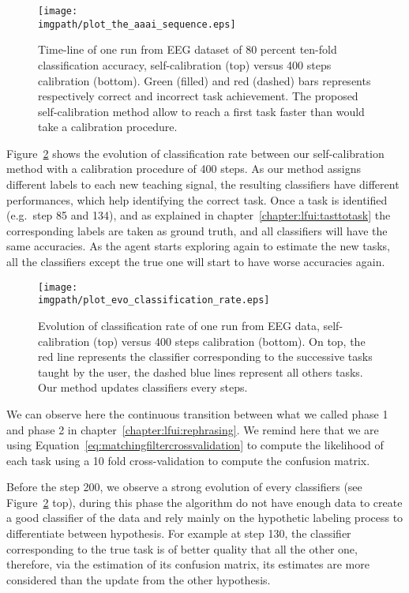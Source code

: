 \begin{figure}[!htbp]
\centering
\texttt{[image: \\imgpath/plot\_the\_aaai\_sequence.eps]}
\caption{Time-line of one run from EEG dataset of $80$ percent ten-fold classification accuracy, self-calibration (top) versus 400 steps calibration (bottom). Green (filled) and red (dashed) bars represents respectively correct and incorrect task achievement. The proposed self-calibration method allow to reach a first task faster than would take a calibration procedure.}
\label{fig:sequence}
\end{figure} 


Figure~\ref{fig:sequence_evolution} shows the evolution of classification rate between our self-calibration method with a calibration procedure of 400 steps. As our method assigns different labels to each new teaching signal, the resulting classifiers have different performances, which help identifying the correct task. Once a task is identified (e.g.\ step 85 and 134), and as explained in chapter~\ref{chapter:lfui:tasttotask} the corresponding labels are taken as ground truth, and all classifiers will have the same accuracies. As the agent starts exploring again to estimate the new tasks, all the classifiers except the true one will start to have worse accuracies again.

\begin{figure}[!htbp]
\centering
\texttt{[image: \\imgpath/plot\_evo\_classification\_rate.eps]}
\caption{Evolution of classification rate of one run from EEG data, self-calibration (top) versus 400 steps calibration (bottom). On top, the red line represents the classifier corresponding to the successive tasks taught by the user, the dashed blue lines represent all others tasks. Our method updates classifiers every steps.}
\label{fig:sequence_evolution}
\end{figure} 

We can observe here the continuous transition between what we called phase 1 and phase 2 in chapter~\ref{chapter:lfui:rephrasing}. We remind here that we are using Equation~\ref{eq:matchingfiltercrossvalidation} to compute the likelihood of each task using a 10 fold cross-validation to compute the confusion matrix.

Before the step 200, we observe a strong evolution of every classifiers (see Figure~\ref{fig:sequence_evolution} top), during this phase the algorithm do not have enough data to create a good classifier of the data and rely mainly on the hypothetic labeling process to differentiate between hypothesis. For example at step 130, the classifier corresponding to the true task is of better quality that all the other one, therefore, via the estimation of its confusion matrix, its estimates are more considered than the update from the other hypothesis. 

